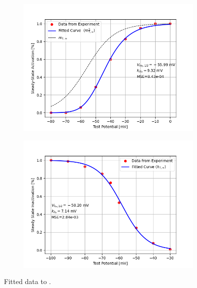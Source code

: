 \documentclass[../../workflow.tex]{subfiles}
\begin{document}
\begin{figure}[htbp]
    \centering
    \begin{subfigure}[t]{0.45\textwidth}
        \centering
        \includegraphics[width=\textwidth]{./img/t_type_calcium_channel/3_fitted_steady_state_activation.png}
    \end{subfigure}
    \hfill
    \begin{subfigure}[t]{0.45\textwidth}
        \centering
        \includegraphics[width=\textwidth]{./img/t_type_calcium_channel/5_fitted_steady_state_inactivation.png}
    \end{subfigure}
    
    \caption{Fitted data to \cite{jeongCaa1TFlyTtype2015}.}
    \label{fig:data_steady_state_from_jeong}
\end{figure}
\end{document}
